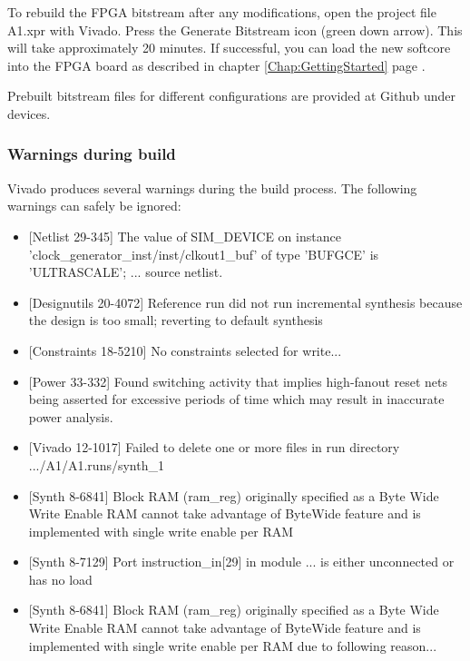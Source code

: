 \documentclass[11pt,a4paper,oneside,openright]{report}
\newcommand{\vv}{ \vspace{2mm} }   %
\begin{document}
To rebuild the FPGA bitstream after any modifications, open the project file 
A1.xpr with Vivado. Press the Generate Bitstream icon (green down arrow). This will take approximately 20 minutes. If successful, you can load the new softcore into the FPGA board as described in chapter \ref{Chap:GettingStarted} page \pageref{Chap:GettingStarted}.
\vv

Prebuilt bitstream files for different configurations are provided at Github under devices.
\vv

\subsubsection{Warnings during build}
Vivado produces several warnings during the build process. The following warnings can safely be ignored:
\vv

\begin{itemize}
\item {}[Netlist 29-345] The value of SIM\_DEVICE on instance 'clock\_generator\_inst/inst/clkout1\_buf' of type 'BUFGCE' is 'ULTRASCALE'; ... source netlist. 

\item {}[Designutils 20-4072] Reference run did not run incremental synthesis because the design is too small; reverting to default synthesis

\item {}[Constraints 18-5210] No constraints selected for write...

\item {}[Power 33-332] Found switching activity that implies high-fanout reset nets being asserted for excessive periods of time which may result in inaccurate power analysis.

\item {}[Vivado 12-1017] Failed to delete one or more files in run directory .../A1/A1.runs/synth\_1

\item {}[Synth 8-6841] Block RAM (ram\_reg) originally specified as a Byte Wide Write Enable RAM cannot take advantage of ByteWide feature and is implemented with single write enable per RAM

\item {}[Synth 8-7129] Port instruction\_in[29] in module ... is either unconnected or has no load

\item {}[Synth 8-6841] Block RAM (ram\_reg) originally specified as a Byte Wide Write Enable RAM cannot take advantage of ByteWide feature and is implemented with single write enable per RAM due to following reason...

\end{itemize}
\vv
\end{document}
